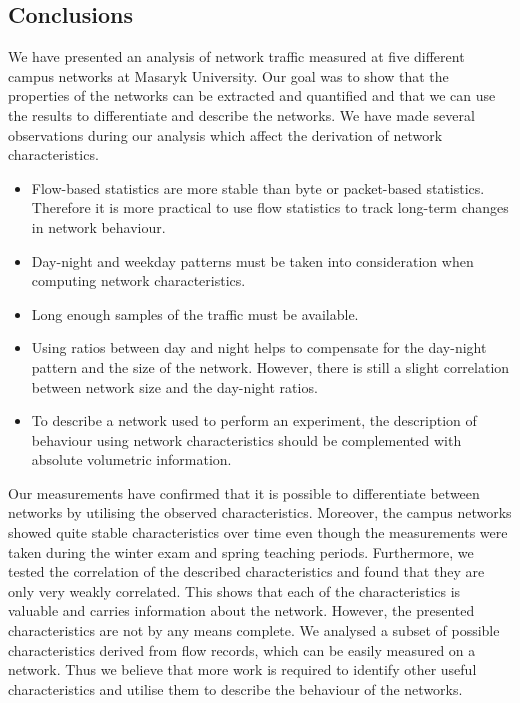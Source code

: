 \subsection{Conclusions} \label{subsec:characterization-conclusions}

We have presented an analysis of network traffic measured at five different campus networks at Masaryk University. Our goal was to show that the properties of the networks can be extracted and quantified and that we can use the results to differentiate and describe the networks. We have made several observations during our analysis which affect the derivation of network characteristics.

\begin{itemize}
    \setlength\itemsep{4pt}
    \item Flow-based statistics are more stable than byte or packet-based statistics. Therefore it is more practical to use flow statistics to track long-term changes in network behaviour.
    \item Day-night and weekday patterns must be taken into consideration when computing network characteristics.
    \item Long enough samples of the traffic must be available.
    \item Using ratios between day and night helps to compensate for the day-night pattern and the size of the network. However, there is still a slight correlation between network size and the day-night ratios.
    \item To describe a network used to perform an experiment, the description of behaviour using network characteristics should be complemented with absolute volumetric information.
\end{itemize}

Our measurements have confirmed that it is possible to differentiate between networks by utilising the observed characteristics. Moreover, the campus networks showed quite stable characteristics over time even though the measurements were taken during the winter exam and spring teaching periods. Furthermore, we tested the correlation of the described characteristics and found that they are only very weakly correlated. This shows that each of the characteristics is valuable and carries information about the network. However, the presented characteristics are not by any means complete. We analysed a subset of possible characteristics derived from flow records, which can be easily measured on a network. Thus we believe that more work is required to identify other useful characteristics and utilise them to describe the behaviour of the networks.


